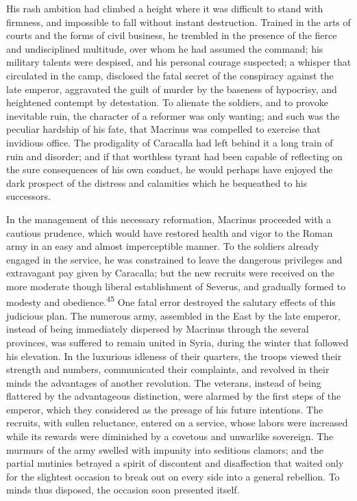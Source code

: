 
His rash ambition had climbed a height where it was difficult to
stand with firmness, and impossible to fall without instant
destruction. Trained in the arts of courts and the forms of civil
business, he trembled in the presence of the fierce and
undisciplined multitude, over whom he had assumed the command;
his military talents were despised, and his personal courage
suspected; a whisper that circulated in the camp, disclosed the
fatal secret of the conspiracy against the late emperor,
aggravated the guilt of murder by the baseness of hypocrisy, and
heightened contempt by detestation. To alienate the soldiers, and
to provoke inevitable ruin, the character of a reformer was only
wanting; and such was the peculiar hardship of his fate, that
Macrinus was compelled to exercise that invidious office. The
prodigality of Caracalla had left behind it a long train of ruin
and disorder; and if that worthless tyrant had been capable of
reflecting on the sure consequences of his own conduct, he would
perhaps have enjoyed the dark prospect of the distress and
calamities which he bequeathed to his successors.

In the management of this necessary reformation, Macrinus
proceeded with a cautious prudence, which would have restored
health and vigor to the Roman army in an easy and almost
imperceptible manner. To the soldiers already engaged in the
service, he was constrained to leave the dangerous privileges and
extravagant pay given by Caracalla; but the new recruits were
received on the more moderate though liberal establishment of
Severus, and gradually formed to modesty and obedience.\textsuperscript{45} One
fatal error destroyed the salutary effects of this judicious
plan. The numerous army, assembled in the East by the late
emperor, instead of being immediately dispersed by Macrinus
through the several provinces, was suffered to remain united in
Syria, during the winter that followed his elevation. In the
luxurious idleness of their quarters, the troops viewed their
strength and numbers, communicated their complaints, and revolved
in their minds the advantages of another revolution. The
veterans, instead of being flattered by the advantageous
distinction, were alarmed by the first steps of the emperor,
which they considered as the presage of his future intentions.
The recruits, with sullen reluctance, entered on a service, whose
labors were increased while its rewards were diminished by a
covetous and unwarlike sovereign. The murmurs of the army swelled
with impunity into seditious clamors; and the partial mutinies
betrayed a spirit of discontent and disaffection that waited only
for the slightest occasion to break out on every side into a
general rebellion. To minds thus disposed, the occasion soon
presented itself.


